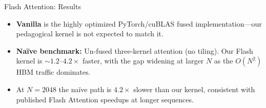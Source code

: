 \documentclass{beamer}
\begin{document}
\begin{frame}{Flash Attention: Results}
    \begin{table}[]
    \centering
    \caption{Latency comparison: optimized PyTorch vs our Flash kernel vs na\"ive attention}
    \end{table}
    \begin{itemize}
        \item \textbf{Vanilla} is the highly optimized PyTorch/cuBLAS fused implementation---our pedagogical kernel is not expected to match it.
        \item \textbf{Na\"ive benchmark:} Un-fused three-kernel attention (no tiling). Our Flash kernel is ${\sim}1.2$--$4.2{\times}$ faster, with the gap widening at larger $N$ as the $O(N^2)$ HBM traffic dominates.
        \item At $N{=}2048$ the na\"ive path is $\mathbf{4.2{\times}}$ slower than our kernel, consistent with published Flash Attention speedups at longer sequences.
    \end{itemize}
\end{frame}
\end{document}
